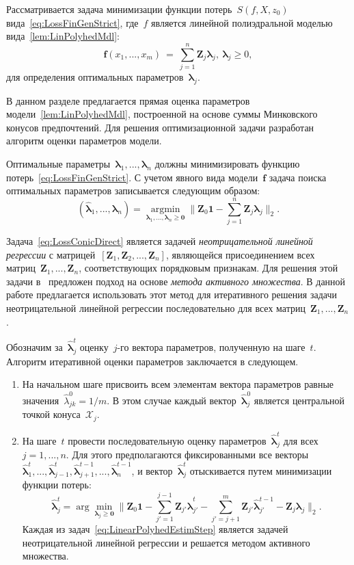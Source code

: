 \documentclass{elsarticle}
\newcommand{\bfx}{\mathbf{f}}
\newcommand{\bZ}{\mathbf{Z}}
\newcommand{\blambda}{\boldsymbol{\lambda}}
\newcommand{\cX}{\mathcal{X}}
\begin{document}
Рассматривается задача минимизации функции потерь~$S(f,X,z_0)$ вида~\eqref{eq:LossFinGenStrict}, где~$f$ является линейной полиэдральной моделью вида~\eqref{lem:LinPolyhedMdl}:
\[
\bfx(x_1,...,x_m)~=~\sum\limits_{j=1}^n\bZ_j\blambda_j,~\blambda_j\geq 0,
\]
для определения оптимальных параметров~$\blambda_j$.

В данном разделе предлагается прямая оценка параметров модели~\eqref{lem:LinPolyhedMdl}, построенной на основе суммы Минковского конусов предпочтений. Для решения оптимизационной задачи разработан алгоритм оценки параметров модели.

Оптимальные параметры~$\blambda_1,...,\blambda_n$ должны минимизировать функцию потерь~\eqref{eq:LossFinGenStrict}.
С учетом явного вида модели~$\bfx$ задача поиска оптимальных параметров записывается следующим образом:
\begin{equation}
(\hat{\blambda}_1,...,\hat{\blambda}_n)=\mathop{\arg\min}\limits_{\blambda_1,...,\blambda_n\geq \mathbf{0}}\|\bZ_0\mathbf{1}-\sum\limits_{j=1}^n\bZ_j\blambda_j\|_2.
\label{eq:LossConicDirect}
\end{equation}

Задача~\eqref{eq:LossConicDirect} является задачей \emph{неотрицательной линейной регрессии} с матрицей~$[\bZ_1,\bZ_2,...,\bZ_n]$, являющейся присоединением всех матриц~$\bZ_1,...,\bZ_n$, соответствующих порядковым признакам. Для решения этой задачи в~\cite{lawson1974solving, chen2009nonnegativity} предложен подход на основе \emph{метода активного множества}. В данной работе предлагается использовать этот метод для итеративного решения задачи неотрицательной линейной регрессии последовательно для всех матриц~$\bZ_1,...,\bZ_n$.
\sloppy{}

Обозначим за~$\hat{\blambda}^t_j$ оценку~$j$-го вектора параметров, полученную на шаге~$t$. Алгоритм итеративной оценки параметров заключается в следующем.
\begin{enumerate}
\item На начальном шаге присвоить всем элементам вектора параметров равные значения~$\hat{\lambda}^0_{jk}=1/m$. В этом случае каждый вектор~$\hat{\blambda}^0_j$ является центральной точкой конуса~$\cX_j$.
\item На шаге~$t$ провести последовательную оценку параметров~$\hat{\blambda}^t_j$ для всех~$j=1,...,n$. Для этого предполагаются фиксированными все векторы~$\hat{\blambda}^t_1,...,\hat{\blambda}^t_{j-1},\hat{\blambda}^{t-1}_{j+1},...,\hat{\blambda}^{t-1}_{n}$, и вектор~$\hat{\blambda}^t_j$ отыскивается путем минимизации функции потерь:
\begin{equation}
\hat{\blambda}^t_j=\arg\min\limits_{\blambda_j\geq\mathbf{0}}\|\bZ_0\mathbf{1}-\sum\limits_{j'=1}^{j-1}\bZ_{j'}\hat{\blambda}^t_{j'}-\sum\limits_{j'=j+1}^{m}\bZ_{j'}\hat{\blambda}^{t-1}_{j'}-\bZ_j\blambda_j\|_2.
\label{eq:LinearPolyhedEstimStep}
\end{equation}
Каждая из задач~\eqref{eq:LinearPolyhedEstimStep} является задачей неотрицательной линейной регрессии и решается методом активного множества.
\end{enumerate}
\end{document}
